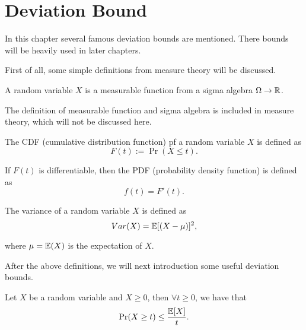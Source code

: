 \documentclass[../main.tex]{subfiles}
\begin{document}
\chapter{Deviation Bound}
In this chapter several famous deviation bounds are mentioned. There bounds will be heavily used in later chapters.

First of all, some simple definitions from measure theory will be discussed.

\begin{definition}
	A random variable $X$ is a measurable function from a sigma algebra $\Omega \to \mathbb{R}$.
\end{definition}

The definition of measurable function and sigma algebra is included in measure theory, which will not be discussed here.

\begin{definition}
	The CDF (cumulative distribution function) pf a random variable $X$ is defined as 
	\begin{equation}
		F(t) := \Pr(X \leq t).
	\end{equation}
\end{definition}

\begin{definition}
	If $F(t)$ is differentiable, then the PDF (probability density function) is defined as 
	\begin{equation}
		f(t) = F'(t).
	\end{equation}
\end{definition}

\begin{definition}
	The variance of a random variable $X$ is defined as 
	\begin{equation}
	Var(X) = \mathbb{E}[(X - \mu)]^2,
	\end{equation}
	
	where $\mu = \mathbb{E}(X)$ is the expectation of $X$.
\end{definition}

After the above definitions, we will next introduction some useful deviation bounds.

\begin{theorem}
	Let $X$ be a random variable and $X \geq 0$, then $\forall t \geq 0$, we have that 
	\begin{equation}
		\Pr(X \geq t)\leq \frac{\mathbb{E}[X]}{t}.
	\end{equation}
\end{theorem}
\end{document}
